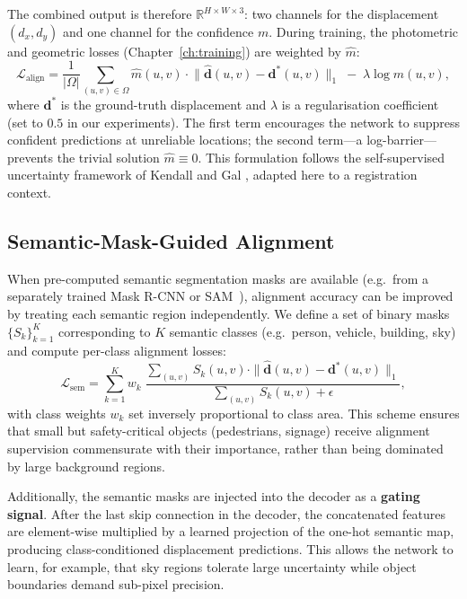The combined output is therefore $\mathbb{R}^{H \times W \times 3}$: two
channels for the displacement $(d_x, d_y)$ and one channel for the
confidence $m$.  During training, the photometric and geometric losses
(Chapter~\ref{ch:training}) are weighted by $\hat{m}$:
\begin{equation}
  \mathcal{L}_{\text{align}}
    = \frac{1}{|\Omega|} \sum_{(u,v) \in \Omega}
      \hat{m}(u,v) \cdot
      \bigl\| \hat{\mathbf{d}}(u,v) - \mathbf{d}^{\ast}(u,v) \bigr\|_1
      \;-\; \lambda \log \hat{m}(u,v),
  \label{eq:mask_loss}
\end{equation}
where $\mathbf{d}^{\ast}$ is the ground-truth displacement and $\lambda$
is a regularisation coefficient (set to $0.5$ in our experiments).  The
first term encourages the network to suppress confident predictions at
unreliable locations; the second term---a log-barrier---prevents the
trivial solution $\hat{m} \equiv 0$.  This formulation follows the
self-supervised uncertainty framework of Kendall and Gal
\cite{kendall2017uncertainties}, adapted here to a registration context.

\subsection{Semantic-Mask-Guided Alignment}
\label{subsec:semantic_mask}

When pre-computed semantic segmentation masks are available (e.g.\ from a
separately trained Mask R-CNN \cite{he2017maskrcnn} or
SAM~\cite{kirillov2023sam}), alignment accuracy can be improved by
treating each semantic region independently.  We define a set of binary
masks $\{S_k\}_{k=1}^{K}$ corresponding to $K$ semantic classes (e.g.\
person, vehicle, building, sky) and compute per-class alignment losses:
\begin{equation}
  \mathcal{L}_{\text{sem}}
    = \sum_{k=1}^{K} w_k \;
      \frac{\sum_{(u,v)} S_k(u,v) \cdot
        \|\hat{\mathbf{d}}(u,v) - \mathbf{d}^{\ast}(u,v)\|_1}
       {\sum_{(u,v)} S_k(u,v) + \epsilon},
  \label{eq:sem_loss}
\end{equation}
with class weights $w_k$ set inversely proportional to class area.  This
scheme ensures that small but safety-critical objects (pedestrians,
signage) receive alignment supervision commensurate with their importance,
rather than being dominated by large background regions.

Additionally, the semantic masks are injected into the decoder as a
\textbf{gating signal}.  After the last skip connection in the decoder,
the concatenated features are element-wise multiplied by a learned
projection of the one-hot semantic map, producing class-conditioned
displacement predictions.  This allows the network to learn, for example,
that sky regions tolerate large uncertainty while object boundaries demand
sub-pixel precision.

